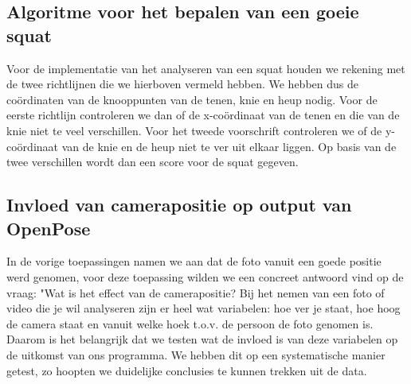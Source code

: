 \documentclass[a4paper,twoside,kulak]{kulakreport}
\begin{document}
\subsection{Algoritme voor het bepalen van een goeie squat}
Voor de implementatie van het analyseren van een squat houden we rekening met de twee richtlijnen die we hierboven vermeld hebben. We hebben dus de coördinaten van de knooppunten van de tenen, knie en heup nodig. Voor de eerste richtlijn controleren we dan of de x-coördinaat van de tenen en die van de knie niet te veel verschillen. Voor het tweede voorschrift controleren we of de y-coördinaat van de knie en de heup niet te ver uit elkaar liggen. Op basis van de twee verschillen wordt dan een score voor de squat gegeven.


\subsection{Invloed van camerapositie op output van OpenPose} \label{camerapositie}
In de vorige toepassingen namen we aan dat de foto vanuit een goede positie werd genomen, voor deze toepassing wilden we een concreet antwoord vind op de vraag: "Wat is het effect van de camerapositie? Bij het nemen van een foto of video die je wil analyseren zijn er heel wat variabelen: hoe ver je staat, hoe hoog de camera staat en vanuit welke hoek t.o.v. de persoon de foto genomen is. Daarom is het belangrijk dat we testen wat de invloed is van deze variabelen op de uitkomst van ons programma. We hebben dit op een systematische manier getest, zo hoopten we duidelijke conclusies te kunnen trekken uit de data.
\end{document}
